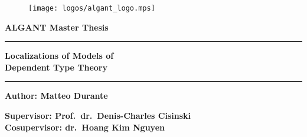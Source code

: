 \thispagestyle{empty}
\begin{titlepage}
  \begin{center}
    \begin{figure}[h!]
      \centering
      \texttt{[image: logos/algant\_logo.mps]}
    \end{figure}
    \vspace{0.4cm}
    \fontsize{15pt}{0.6cm}\selectfont
    {\textbf{ALGANT Master Thesis}}
    \vspace{0.2cm}
    \rule{\linewidth}{0.3mm}
    
    \vspace{0.05cm}
    \Huge{\textbf{Localizations of Models of
        \\ %
        Dependent Type Theory}}\\
    \vspace{0.05cm}
    
    \rule{\linewidth}{0.3mm}
    
    \vspace{1cm}
    
    \large{\textbf{Author: Matteo Durante}}\\
    \vspace{1cm}
    
    \large{\textbf{Supervisor: Prof.\ dr.\ Denis-Charles Cisinski}} \\
    \vspace{0.1cm}
    \large{\textbf{Cosupervisor: dr.\ Hoang Kim Nguyen}} \\
    
    \vfill
    

\end{center}
\end{titlepage}
